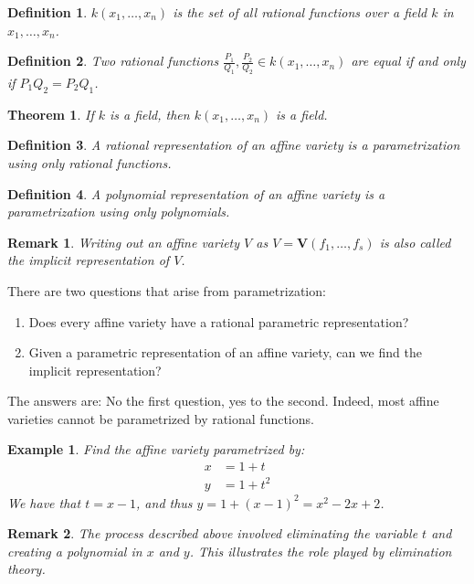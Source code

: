\documentclass{article}
\theoremstyle{mystyle}
\newtheorem{theorem}{Theorem}[section]
\newtheorem{definition}{Definition}[section]
\newtheorem{example}{Example}[section]
\newtheorem{remark}{Remark}[section]
\begin{document}
\begin{definition}
$k(x_1,\hdots ,x_n)$ is the set of all rational functions over a field $k$ in $x_1,\hdots, x_n$.
\end{definition}
\begin{definition}
Two rational functions $\frac{P_1}{Q_1}, \frac{P_2}{Q_2} \in k(x_1,\hdots ,x_n)$ are equal if and only if $P_1Q_2 = P_2Q_1$.
\end{definition}
\begin{theorem}
If $k$ is a field, then $k(x_1,\hdots ,x_n)$ is a field.
\end{theorem}
\begin{definition}
A rational representation of an affine variety is a parametrization using only rational functions.
\end{definition}
\begin{definition}
A polynomial representation of an affine variety is a parametrization using only polynomials.
\end{definition}
\begin{remark}
Writing out an affine variety $V$ as $V=\mathbf{V}(f_1,\hdots, f_s)$ is also called the implicit representation of $V$.
\end{remark}
There are two questions that arise from parametrization:
\begin{enumerate}
    \item Does every affine variety have a rational parametric representation?
    \item Given a parametric representation of an affine variety, can we find the implicit representation?
\end{enumerate}
The answers are: No the first question, yes to the second. Indeed, most affine varieties cannot be parametrized by rational functions.
\begin{example}
Find the affine variety parametrized by:
\begin{align*}
    x &= 1+t \\
    y &= 1+t^2
\end{align*}
We have that $t = x-1$, and thus $y = 1+(x-1)^2 = x^2-2x+2$.
\end{example}
\begin{remark}
The process described above involved eliminating the variable $t$ and creating a polynomial in $x$ and $y$. This illustrates the role played by elimination theory.
\end{remark}
\end{document}
